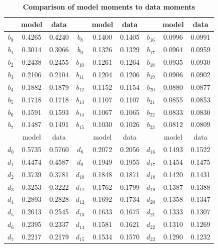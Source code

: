 \documentclass[letterpaper,12pt]{article}
\theoremstyle{definition}
\begin{document}
\begin{spacing}{1.5}{}
  \begin{table}[h!] \centering \captionsetup{width=4.0in}
    \caption{\label{TabMoments}\textbf{Comparison of model moments to data moments}}
      \begin{tabular}{ c c c | c c c | c c c }
      \hline\hline
       & model & data & & model & data & & model & data \\
      \hline
      $b_0$ & 0.4265 & 0.4240 & $b_8$ & 0.1400 & 0.1405 & $b_{16}$ & 0.0996 & 0.0991 \\
      $b_1$ & 0.3014 & 0.3066 & $b_9$ & 0.1326 & 0.1329 & $b_{17}$ & 0.0964 & 0.0959 \\
      $b_2$ & 0.2438 & 0.2455 & $b_{10}$ & 0.1261 & 0.1264 & $b_{18}$ & 0.0935 & 0.0930 \\
      $b_3$ & 0.2106 & 0.2104 & $b_{11}$ & 0.1204 & 0.1206 & $b_{19}$ & 0.0906 & 0.0902 \\
      $b_4$ & 0.1882 & 0.1879 & $b_{12}$ & 0.1152 & 0.1154 & $b_{20}$ & 0.0880 & 0.0877 \\
      $b_5$ & 0.1718 & 0.1718 & $b_{13}$ & 0.1107 & 0.1107 & $b_{21}$ & 0.0855 & 0.0853 \\
      $b_6$ & 0.1591 & 0.1593 & $b_{14}$ & 0.1067 & 0.1065 & $b_{22}$ & 0.0833 & 0.0830 \\
      $b_7$ & 0.1487 & 0.1491 & $b_{15}$ & 0.1030 & 0.1026 & $b_{23}$ & 0.0812 & 0.0809 \\
      \hline\hline
       & model & data & & model & data & & model & data \\
      \hline
      $d_0$ & 0.5735 & 0.5760 & $d_8$ & 0.2072 & 0.2056 & $d_{16}$ & 0.1493 & 0.1522 \\
      $d_1$ & 0.4474 & 0.4587 & $d_9$ & 0.1949 & 0.1955 & $d_{17}$ & 0.1454 & 0.1475 \\
      $d_2$ & 0.3739 & 0.3781 & $d_{10}$ & 0.1848 & 0.1871 & $d_{18}$ & 0.1420 & 0.1431 \\
      $d_3$ & 0.3253 & 0.3222 & $d_{11}$ & 0.1762 & 0.1799 & $d_{19}$ & 0.1387 & 0.1388 \\
      $d_4$ & 0.2893 & 0.2828 & $d_{12}$ & 0.1692 & 0.1734 & $d_{20}$ & 0.1358 & 0.1347 \\
      $d_5$ & 0.2613 & 0.2545 & $d_{13}$ & 0.1633 & 0.1675 & $d_{21}$ & 0.1333 & 0.1307 \\
      $d_6$ & 0.2395 & 0.2337 & $d_{14}$ & 0.1581 & 0.1621 & $d_{22}$ & 0.1310 & 0.1269 \\
      $d_7$ & 0.2217 & 0.2179 & $d_{15}$ & 0.1534 & 0.1570 & $d_{23}$ & 0.1290 & 0.1232 \\
      \hline\hline
    \end{tabular}
  \end{table}


\end{spacing}
\end{document}
